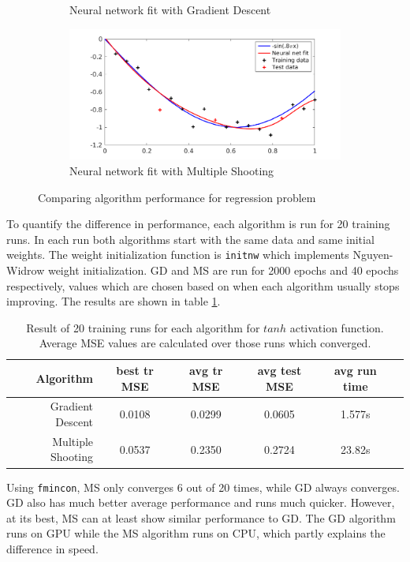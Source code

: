 \begin{figure}
\begin{subfigure}[b]{0.45\textwidth}
         \caption{Neural network fit with Gradient Descent}
         \label{gdfit}
     \end{subfigure}
     \begin{subfigure}[b]{0.45\textwidth}
         \centering
         \includegraphics[width=\textwidth]{fminfit}
         \caption{Neural network fit with Multiple Shooting}
         \label{fminfit}
     \end{subfigure}
    \caption{Comparing algorithm performance for regression problem}
    \label{compalg}
\end{figure}

To quantify the difference in performance, each algorithm is run for 20 training runs. In each run both algorithms start with the same data and same initial weights. The weight initialization function is \texttt{initnw} which implements Nguyen-Widrow weight initialization. GD and MS are run for 2000 epochs and 40 epochs respectively, values which are chosen based on when each algorithm usually stops improving. The results are shown in table \ref{tab:tanh}.

\begin{table}
	\centering
	\begin{tabular}{r | c c c c c}
		Algorithm & \small best tr MSE & \small avg tr MSE & \small avg test MSE & \small avg run time \\ \hline
		Gradient Descent & 0.0108 & 0.0299 & 0.0605 & 1.577s \\
		Multiple Shooting & 0.0537 & 0.2350 & 0.2724 & 23.82s \\
	\end{tabular}
	\caption{Result of 20 training runs for each algorithm for $tanh$ activation function. Average MSE values are calculated over those runs which converged.}
	\label{tab:tanh}
\end{table}

Using \texttt{fmincon}, MS only converges 6 out of 20 times, while GD always converges. GD also has much better average performance and runs much quicker. However, at its best, MS can at least show similar performance to GD. The GD algorithm runs on GPU while the MS algorithm runs on CPU, which partly explains the difference in speed.

